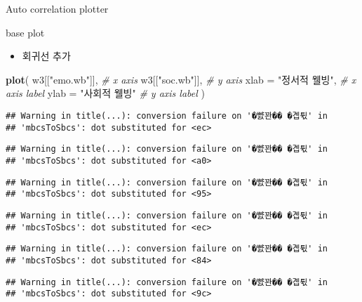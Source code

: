 \documentclass[ignorenonframetext,]{beamer}
\newenvironment{Shaded}{\begin{snugshade}}{\end{snugshade}}
\newcommand{\KeywordTok}[1]{\textcolor[rgb]{0.13,0.29,0.53}{\textbf{#1}}}
\newcommand{\DataTypeTok}[1]{\textcolor[rgb]{0.13,0.29,0.53}{#1}}
\newcommand{\StringTok}[1]{\textcolor[rgb]{0.31,0.60,0.02}{#1}}
\newcommand{\CommentTok}[1]{\textcolor[rgb]{0.56,0.35,0.01}{\textit{#1}}}
\newcommand{\NormalTok}[1]{#1}
\providecommand{\tightlist}{%
  \setlength{\itemsep}{0pt}\setlength{\parskip}{0pt}}
\begin{document}
\begin{frame}[fragile]{Auto correlation plotter}

\begin{block}{base plot}

\begin{itemize}
\tightlist
\item
  회귀선 추가
\end{itemize}

\begin{Shaded}
\begin{Highlighting}[]
\KeywordTok{plot}\NormalTok{(}
\NormalTok{    w3[[}\StringTok{"emo.wb"}\NormalTok{]], }\CommentTok{# x axis}
\NormalTok{    w3[[}\StringTok{"soc.wb"}\NormalTok{]], }\CommentTok{# y axis}
    \DataTypeTok{xlab =} \StringTok{"정서적 웰빙"}\NormalTok{, }\CommentTok{# x axis label}
    \DataTypeTok{ylab =} \StringTok{"사회적 웰빙"} \CommentTok{# y axis label}
\NormalTok{    ) }
\end{Highlighting}
\end{Shaded}

\begin{verbatim}
## Warning in title(...): conversion failure on '�뺤꽌�� �곕튃' in
## 'mbcsToSbcs': dot substituted for <ec>
\end{verbatim}

\begin{verbatim}
## Warning in title(...): conversion failure on '�뺤꽌�� �곕튃' in
## 'mbcsToSbcs': dot substituted for <a0>
\end{verbatim}

\begin{verbatim}
## Warning in title(...): conversion failure on '�뺤꽌�� �곕튃' in
## 'mbcsToSbcs': dot substituted for <95>
\end{verbatim}

\begin{verbatim}
## Warning in title(...): conversion failure on '�뺤꽌�� �곕튃' in
## 'mbcsToSbcs': dot substituted for <ec>
\end{verbatim}

\begin{verbatim}
## Warning in title(...): conversion failure on '�뺤꽌�� �곕튃' in
## 'mbcsToSbcs': dot substituted for <84>
\end{verbatim}

\begin{verbatim}
## Warning in title(...): conversion failure on '�뺤꽌�� �곕튃' in
## 'mbcsToSbcs': dot substituted for <9c>
\end{verbatim}


\end{block}
\end{frame}
\end{document}
